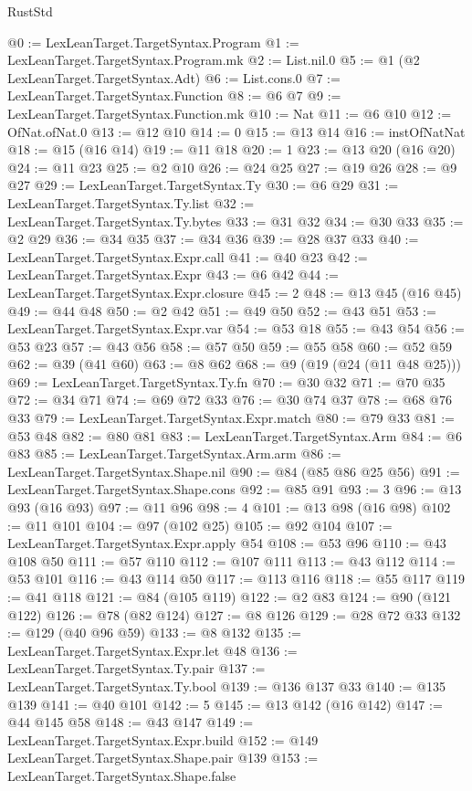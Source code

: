 \begin{lexlean}{RustStd}
\begin{coremodule}
@0 := LexLeanTarget.TargetSyntax.Program
@1 := LexLeanTarget.TargetSyntax.Program.mk
@2 := List.nil.{0}
@5 := @1 (@2 LexLeanTarget.TargetSyntax.Adt)
@6 := List.cons.{0}
@7 := LexLeanTarget.TargetSyntax.Function
@8 := @6 @7
@9 := LexLeanTarget.TargetSyntax.Function.mk
@10 := Nat
@11 := @6 @10
@12 := OfNat.ofNat.{0}
@13 := @12 @10
@14 := 0
@15 := @13 @14
@16 := instOfNatNat
@18 := @15 (@16 @14)
@19 := @11 @18
@20 := 1
@23 := @13 @20 (@16 @20)
@24 := @11 @23
@25 := @2 @10
@26 := @24 @25
@27 := @19 @26
@28 := @9 @27
@29 := LexLeanTarget.TargetSyntax.Ty
@30 := @6 @29
@31 := LexLeanTarget.TargetSyntax.Ty.list
@32 := LexLeanTarget.TargetSyntax.Ty.bytes
@33 := @31 @32
@34 := @30 @33
@35 := @2 @29
@36 := @34 @35
@37 := @34 @36
@39 := @28 @37 @33
@40 := LexLeanTarget.TargetSyntax.Expr.call
@41 := @40 @23
@42 := LexLeanTarget.TargetSyntax.Expr
@43 := @6 @42
@44 := LexLeanTarget.TargetSyntax.Expr.closure
@45 := 2
@48 := @13 @45 (@16 @45)
@49 := @44 @48
@50 := @2 @42
@51 := @49 @50
@52 := @43 @51
@53 := LexLeanTarget.TargetSyntax.Expr.var
@54 := @53 @18
@55 := @43 @54
@56 := @53 @23
@57 := @43 @56
@58 := @57 @50
@59 := @55 @58
@60 := @52 @59
@62 := @39 (@41 @60)
@63 := @8 @62
@68 := @9 (@19 (@24 (@11 @48 @25)))
@69 := LexLeanTarget.TargetSyntax.Ty.fn
@70 := @30 @32
@71 := @70 @35
@72 := @34 @71
@74 := @69 @72 @33
@76 := @30 @74 @37
@78 := @68 @76 @33
@79 := LexLeanTarget.TargetSyntax.Expr.match
@80 := @79 @33
@81 := @53 @48
@82 := @80 @81
@83 := LexLeanTarget.TargetSyntax.Arm
@84 := @6 @83
@85 := LexLeanTarget.TargetSyntax.Arm.arm
@86 := LexLeanTarget.TargetSyntax.Shape.nil
@90 := @84 (@85 @86 @25 @56)
@91 := LexLeanTarget.TargetSyntax.Shape.cons
@92 := @85 @91
@93 := 3
@96 := @13 @93 (@16 @93)
@97 := @11 @96
@98 := 4
@101 := @13 @98 (@16 @98)
@102 := @11 @101
@104 := @97 (@102 @25)
@105 := @92 @104
@107 := LexLeanTarget.TargetSyntax.Expr.apply @54
@108 := @53 @96
@110 := @43 @108 @50
@111 := @57 @110
@112 := @107 @111
@113 := @43 @112
@114 := @53 @101
@116 := @43 @114 @50
@117 := @113 @116
@118 := @55 @117
@119 := @41 @118
@121 := @84 (@105 @119)
@122 := @2 @83
@124 := @90 (@121 @122)
@126 := @78 (@82 @124)
@127 := @8 @126
@129 := @28 @72 @33
@132 := @129 (@40 @96 @59)
@133 := @8 @132
@135 := LexLeanTarget.TargetSyntax.Expr.let @48
@136 := LexLeanTarget.TargetSyntax.Ty.pair
@137 := LexLeanTarget.TargetSyntax.Ty.bool
@139 := @136 @137 @33
@140 := @135 @139
@141 := @40 @101
@142 := 5
@145 := @13 @142 (@16 @142)
@147 := @44 @145 @58
@148 := @43 @147
@149 := LexLeanTarget.TargetSyntax.Expr.build
@152 := @149 LexLeanTarget.TargetSyntax.Shape.pair @139
@153 := LexLeanTarget.TargetSyntax.Shape.false

\end{coremodule}
\end{lexlean}
